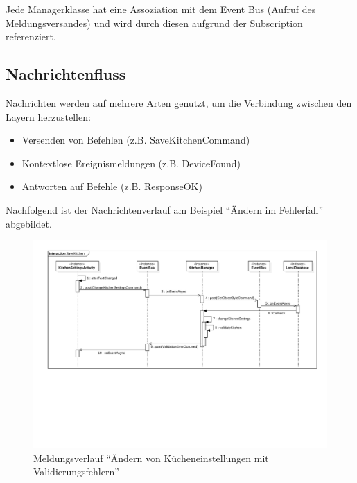 Jede Managerklasse hat eine Assoziation mit dem Event Bus (Aufruf des Meldungsversandes) und wird durch diesen aufgrund der Subscription referenziert.

\subsection{Nachrichtenfluss}
Nachrichten werden auf mehrere Arten genutzt, um die Verbindung zwischen den Layern herzustellen:

\begin{itemize}
\item{Versenden von Befehlen (z.B. SaveKitchenCommand)}
\item{Kontextlose Ereignismeldungen (z.B. DeviceFound)}
\item{Antworten auf Befehle (z.B. ResponseOK)}
\end{itemize}

Nachfolgend ist der Nachrichtenverlauf am Beispiel \enquote{Ändern im Fehlerfall} abgebildet.

\begin{figure}[H]
    \begin{center}
        \includegraphics[trim=40 225 30 30,clip,scale=0.55]{results/res/messages}
    \end{center}
    \caption{Meldungsverlauf \enquote{Ändern von Kücheneinstellungen mit Validierungsfehlern}}
    \label{abb:messages}
\end{figure}

